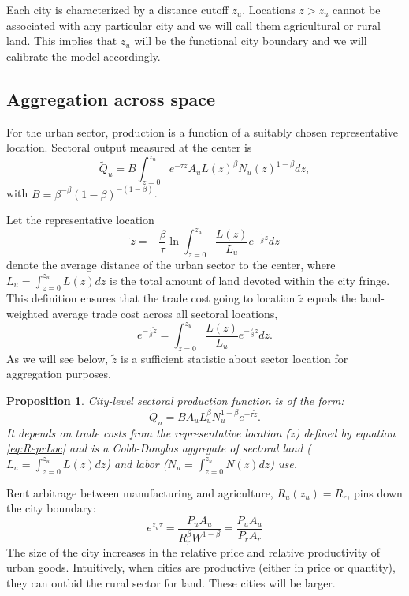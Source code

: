 \documentclass[12pt]{article}
\newtheorem{proposition}{Proposition}
\begin{document}
Each city is characterized by a distance cutoff $z_u$. Locations $z>z_u$ cannot be associated with any particular city and we will call them agricultural or rural land. This implies that $z_u$ will be the functional city boundary and we will calibrate the model accordingly.

\subsection{Aggregation across space}
For the urban sector, production is a function of a suitably chosen representative location. Sectoral output measured at the center is
\begin{equation*}
\tilde{Q}_u=B\int_{z=0}^{z_u}e^{-\tau z}A_uL(z)^\beta N_u(z)^{1-\beta}dz,
\end{equation*}
with $B=\beta^{-\beta}(1-\beta)^{-(1-\beta)}$.

Let the representative location
\begin{equation}
\label{eq:ReprLoc}
\tilde z = -
\frac{\beta}{\tau}
\ln\int_{z=0}^{z_u} \frac{L(z)}{L_u}e^{-\frac{\tau}{\beta} z}dz
\end{equation}
denote the average distance of the urban sector to the center, where $L_u=\int_{z=0}^{z_u} L(z)dz$ is the total amount of land devoted within the city fringe. This definition ensures that the trade cost going to location $\tilde z$ equals the land-weighted average trade cost across all sectoral locations,
\[
e^{-\frac{\tau}{\beta} \tilde z} = \int_{z=0}^{z_u} \frac{L(z)}{L_u}e^{-\frac{\tau}{\beta} z}dz.
\]
As we will see below, $\tilde z$ is a sufficient statistic about sector location for aggregation purposes.

\begin{proposition}\label{prop:aggregation}
City-level sectoral production function is of the form:
\begin{equation}
\tilde Q_u =
BA_uL_u^{\beta}N_u^{1-\beta}
 e^{-\tau\tilde z}.
\end{equation}
It depends on trade costs from the representative location ($\tilde{z}$) defined by equation \eqref{eq:ReprLoc} and is a Cobb-Douglas aggregate of sectoral land ($L_u=\int_{z=0}^{z_u}L(z)dz$) and labor ($N_u=\int_{z=0}^{z_u}N(z)dz$) use.
\end{proposition}

Rent arbitrage between manufacturing and agriculture, $R_u(z_{u}) = R_{r}$, pins down the city boundary:
\begin{equation}\label{eq:city_boundary}
e^{z_{u} \tau} =
\frac {P_uA_u} {R_r^{\beta} W^{1-\beta}}
 =
\frac {P_uA_u}{P_rA_r}
\end{equation}
The size of the city increases in the relative price and relative productivity of urban goods. Intuitively, when cities are productive (either in price or quantity), they can outbid the rural sector for land. These cities will be larger. 
\end{document}
